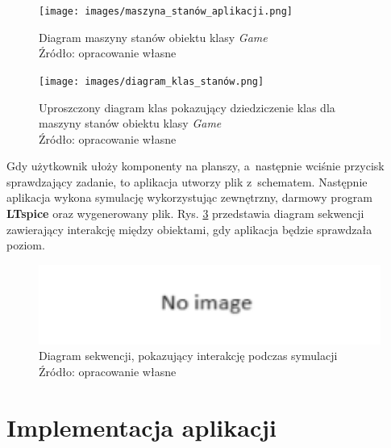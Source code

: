 \documentclass[12pt,a4paper]{article} %
\begin{document}
\begin{figure}[h]
	\centering
	\texttt{[image: images/maszyna\_stanów\_aplikacji.png]}
	\caption{Diagram maszyny stanów obiektu klasy \textit{Game} \\ Źródło: opracowanie własne}
	\label{rys:diagram_maszyny_stanów}
\end{figure}



\begin{figure}[h]
	\centering
	\texttt{[image: images/diagram\_klas\_stanów.png]}
	\caption{Uproszczony diagram klas pokazujący dziedziczenie klas dla maszyny stanów obiektu klasy \textit{Game} \\ Źródło: opracowanie własne}
	\label{rys:diagram_klas_stanów}
\end{figure}


\aka Gdy użytkownik ułoży komponenty na planszy, a~następnie wciśnie przycisk sprawdzający zadanie, to aplikacja utworzy plik z~schematem. Następnie aplikacja wykona symulację wykorzystując zewnętrzny, darmowy program \textbf{LTspice} oraz wygenerowany plik.
Rys. \ref{rys:diagrma_sekwencji_symulacji} przedstawia diagram sekwencji zawierający interakcję między obiektami, gdy aplikacja będzie sprawdzała poziom.

\begin{figure}[h]
	\centering
	\includegraphics[width=15cm]{images/no_image.png}
	\caption{Diagram sekwencji, pokazujący interakcję podczas symulacji \\ Źródło: opracowanie własne}
	\label{rys:diagrma_sekwencji_symulacji}
\end{figure} 

\clearpage
\section{Implementacja aplikacji}
\end{document}
